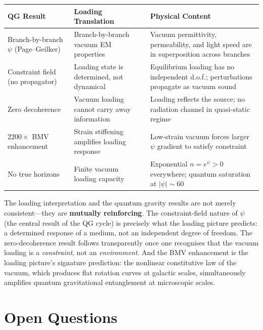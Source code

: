 \documentclass[11pt,a4paper]{article}
\begin{document}
\begin{center}
\begin{tabular}{p{3.5cm}p{4.5cm}p{5cm}}
\toprule
\textbf{QG Result} & \textbf{Loading Translation} &
\textbf{Physical Content} \\
\midrule
Branch-by-branch $\psi$ (Page--Geilker) &
Branch-by-branch vacuum EM properties &
Vacuum permittivity, permeability, and light speed are in superposition
across branches \\
\addlinespace
Constraint field (no propagator) &
Loading state is determined, not dynamical &
Equilibrium loading has no independent d.o.f.; perturbations propagate as
vacuum sound \\
\addlinespace
Zero decoherence &
Vacuum loading cannot carry away information &
Loading reflects the source; no radiation channel in quasi-static regime \\
\addlinespace
$2200\times$ BMV enhancement &
Strain stiffening amplifies loading response &
Low-strain vacuum forces larger $\psi$ gradient to satisfy constraint \\
\addlinespace
No true horizons &
Finite vacuum loading capacity &
Exponential $n = e^\psi > 0$ everywhere; quantum saturation at
$|\psi| \sim 60$ \\
\bottomrule
\end{tabular}
\end{center}

The loading interpretation and the quantum gravity results are not merely
consistent---they are \textbf{mutually reinforcing}.  The constraint-field
nature of $\psi$ (the central result of the QG cycle) is precisely what the
loading picture predicts: a determined response of a medium, not an
independent degree of freedom.  The zero-decoherence result follows
transparently once one recognises that the vacuum loading is a
\emph{constraint}, not an \emph{environment}.  And the BMV enhancement is
the loading picture's signature prediction: the nonlinear constitutive
law of the vacuum, which produces flat rotation curves at galactic scales,
simultaneously amplifies quantum gravitational entanglement at microscopic
scales.


\section{Open Questions}
\label{sec:open}
\end{document}
